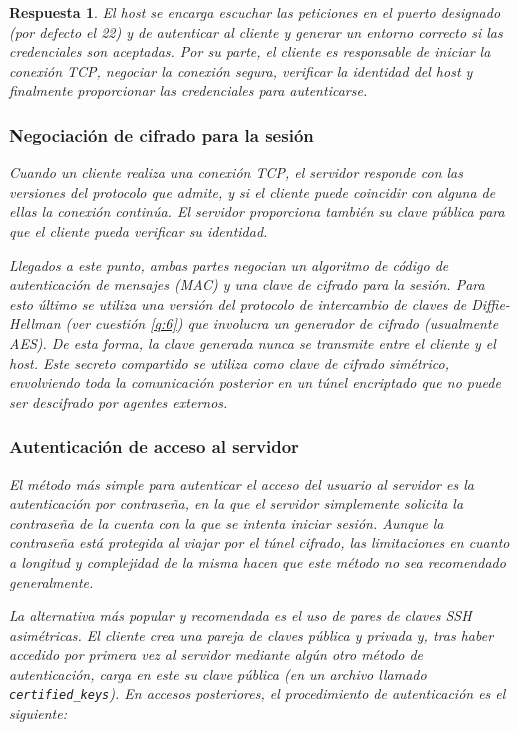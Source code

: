 \documentclass[
  a4paper,
  spanish,
  12pt,
]{scrartcl}
\theoremstyle{ejercicio-style}
\theoremstyle{remark-style}
\newtheorem*{sol}{Respuesta}
\theoremstyle{teorema-style}
\begin{document}
\begin{sol}
  El \textit{host} se encarga escuchar las peticiones en el puerto designado (por defecto el 22) y de autenticar al cliente y generar un entorno correcto si las credenciales son aceptadas. Por su parte, el cliente es responsable de iniciar la conexión TCP, negociar la conexión segura, verificar la identidad del host y finalmente proporcionar las credenciales para autenticarse.

  \subsubsection*{Negociación de cifrado para la sesión}

  Cuando un cliente realiza una conexión TCP, el servidor responde con las versiones del protocolo que admite, y si el cliente puede coincidir con alguna de ellas la conexión continúa. El servidor proporciona también su clave pública para que el cliente pueda verificar su identidad.

  Llegados a este punto, ambas partes negocian un algoritmo de código de autenticación de mensajes (MAC) y una clave de cifrado para la sesión. Para esto último se utiliza una versión del protocolo de intercambio de claves de Diffie-Hellman (ver cuestión \ref{q:6}) que involucra un generador de cifrado (usualmente AES). De esta forma, la clave generada nunca se transmite entre el cliente y el \textit{host}. Este secreto compartido se utiliza como clave de cifrado simétrico, envolviendo toda la comunicación posterior en un túnel encriptado que no puede ser descifrado por agentes externos.

  \subsubsection*{Autenticación de acceso al servidor}

  El método más simple para autenticar el acceso del usuario al servidor es la autenticación por contraseña, en la que el servidor simplemente solicita la contraseña de la cuenta con la que se intenta iniciar sesión. Aunque la contraseña está protegida al viajar por el túnel cifrado, las limitaciones en cuanto a longitud y complejidad de la misma hacen que este método no sea recomendado generalmente.

  La alternativa más popular y recomendada es el uso de pares de claves SSH asimétricas. El cliente crea una pareja de claves pública y privada y, tras haber accedido por primera vez al servidor mediante algún otro método de autenticación, carga en este su clave pública (en un archivo llamado \verb|certified_keys|). En accesos posteriores, el procedimiento de autenticación es el siguiente:


\end{sol}
\end{document}
